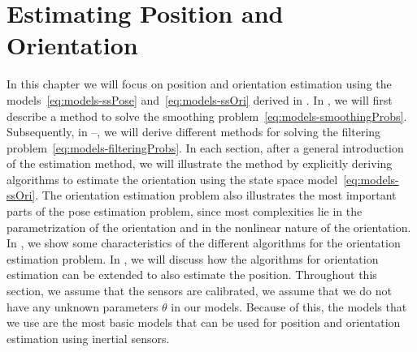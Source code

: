 \chapter{Estimating Position and Orientation}
\label{cha:orientationEstimation} 
In this chapter we will focus on position and orientation estimation using the models~\eqref{eq:models-ssPose} and~\eqref{eq:models-ssOri} derived in . In , we will first describe a method to solve the smoothing problem~\eqref{eq:models-smoothingProbs}. Subsequently, in --, we will derive different methods for solving the filtering problem~\eqref{eq:models-filteringProbs}. In each section, after a general introduction of the estimation method, we will illustrate the method by explicitly deriving algorithms to estimate the orientation using the state space model~\eqref{eq:models-ssOri}. The orientation estimation problem also illustrates the most important parts of the pose estimation problem, since most complexities lie in the parametrization of the orientation and in the nonlinear nature of  the orientation. In , we show some characteristics of the different algorithms for the orientation estimation problem. In , we will discuss how the algorithms for orientation estimation can be extended to also estimate the position. Throughout this section, we assume that the sensors are calibrated, \ie we assume that we do not have any unknown parameters $\theta$ in our models. Because of this, the models that we use are the most basic models that can be used for position and orientation estimation using inertial sensors. 

